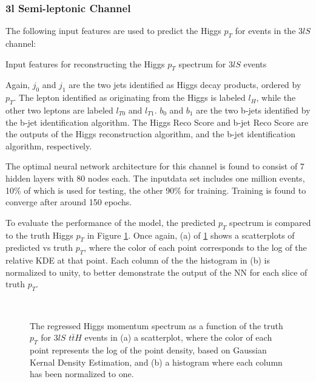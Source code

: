 
\subsubsection{3l Semi-leptonic Channel}
\label{subsec:pt3lS}

The following input features are used to predict the Higgs $p_T$ for events in the $3lS$ channel:

\begin{table}[H]

  \caption{Input features for reconstructing the Higgs $p_T$ spectrum for $3lS$ events}
  \label{tab:pt3lSfeatures}
\end{table}

Again, $j_0$ and $j_1$ are the two jets identified as Higgs decay products, ordered by $p_T$. The lepton identified as originating from the Higgs is labeled $l_H$, while the other two leptons are labeled $l_{T0}$ and $l_{T1}$. $b_0$ and $b_1$ are the two b-jets identified by the b-jet identification algorithm. The Higgs Reco Score and b-jet Reco Score are the outputs of the Higgs reconstruction algorithm, and the b-jet identification algorithm, respectively.

The optimal neural network architecture for this channel is found to consist of 7 hidden layers with 80 nodes each. The inputdata set includes one million events, 10\% of which is used for testing, the other 90\% for training. Training is found to converge after around 150 epochs.

To evaluate the performance of the model, the predicted $p_T$ spectrum is compared to the truth Higgs $p_T$ in Figure \ref{fig:pt3lSresults}. Once again, (a) of \ref{fig:pt3lSresults} shows a scatterplots of predicted vs truth $p_T$, where the color of each point corresponds to the log of the relative KDE at that point. Each column of the the histogram in (b) is normalized to unity, to better demonstrate the output of the NN for each slice of truth $p_T$.
                                                                                                                             
\begin{figure}[H]
    \centering
    \\                     
    \caption{The regressed Higgs momentum spectrum as a function of the truth $p_T$ for $3lS$ $t\bar{t}H$ events in (a) a scatterplot, where the color of each point represents the log of the point density, based on Gaussian Kernal Density Estimation, and (b) a histogram where each column  has been normalized to one.}
    \label{fig:pt3lSresults}
\end{figure}

